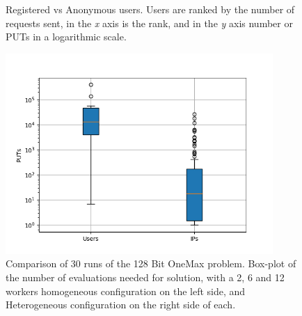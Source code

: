 \documentclass{llncs}
\begin{document}
\begin{figure}[t]
    \centering

    \caption{
        Registered vs Anonymous users.  Users are ranked by
        the number of requests sent, in the \emph{x} axis is the rank, and in the \emph{y} axis 
        number or PUTs in a logarithmic scale.    }
    \label{fig:puts}
\end{figure}

\begin{figure}[t]
    \centering
        \includegraphics[width=4in]{img/puts_box.png}
    \caption{Comparison of 30 runs of the 128 Bit OneMax problem. 
    Box-plot of the number of evaluations needed for solution, with a 2, 6 and 12 workers
    homogeneous configuration on the left side, and Heterogeneous configuration on the
    right side of each.
    }
    \label{fig:comp-onemax}
\end{figure}
\end{document}
